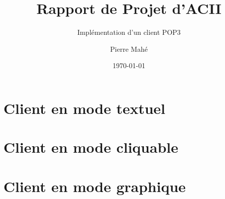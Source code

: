 \documentclass[a4paper, titlepage, oneside, 12pt]{article}%
\title{Rapport de Projet d'ACII}
\subtitle{Implémentation d'un client POP3}
\author{Pierre Mahé}
\date{\today}
\begin{document}
 
\maketitle 
\tableofcontents

\newpage

\section{Client en mode textuel}

\section{Client en mode cliquable}

\section{Client en mode graphique}
\end{document}
